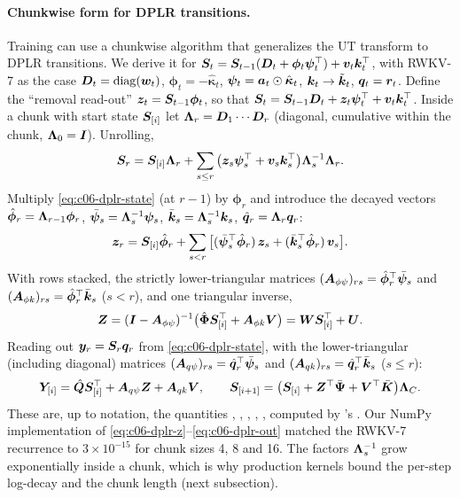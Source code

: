 \paragraph{Chunkwise form for DPLR transitions.}
Training can use a chunkwise algorithm that generalizes the UT transform to DPLR transitions.
We derive it for $\bm{S}_t=\bm{S}_{t-1}(\bm{D}_t+\bm\phi_t\bm\psi_t^{\top})+\bm{v}_t\bm{k}_t^{\top}$, with RWKV-7 as
the case $\bm{D}_t=\operatorname{diag}(\bm{w}_t)$, $\bm\phi_t=-\hat{\bm\kappa}_t$,
$\bm\psi_t=\bm{a}_t\odot\hat{\bm\kappa}_t$, $\bm{k}_t\to\tilde{\bm{k}}_t$, $\bm{q}_t=\bm{r}_t$. Define the
``removal read-out'' $\bm{z}_t=\bm{S}_{t-1}\bm\phi_t$, so that
$\bm{S}_t=\bm{S}_{t-1}\bm{D}_t+\bm{z}_t\bm\psi_t^{\top}+\bm{v}_t\bm{k}_t^{\top}$. Inside a chunk with start state
$\bm{S}_{[i]}$ let $\bm{\Lambda}_r=\bm{D}_1\cdots\bm{D}_r$ (diagonal, cumulative within the chunk,
$\bm{\Lambda}_0=\bm{I}$). Unrolling,
\begin{equation}\label{eq:c06-dplr-state}
  \bm{S}_r=\bm{S}_{[i]}\bm{\Lambda}_r+\sum_{s\le r}\big(\bm{z}_s\bm\psi_s^{\top}+\bm{v}_s\bm{k}_s^{\top}\big)\bm{\Lambda}_s^{-1}\bm{\Lambda}_r .
\end{equation}
Multiply \eqref{eq:c06-dplr-state} (at $r-1$) by $\bm\phi_r$ and introduce the decayed vectors
$\hat{\bm\phi}_r=\bm{\Lambda}_{r-1}\bm\phi_r$, $\bar{\bm\psi}_s=\bm{\Lambda}_s^{-1}\bm\psi_s$,
$\bar{\bm{k}}_s=\bm{\Lambda}_s^{-1}\bm{k}_s$, $\hat{\bm{q}}_r=\bm{\Lambda}_r\bm{q}_r$:
\begin{equation}
  \bm{z}_r=\bm{S}_{[i]}\hat{\bm\phi}_r+\sum_{s<r}\big[(\bar{\bm\psi}_s^{\top}\hat{\bm\phi}_r)\,\bm{z}_s+(\bar{\bm{k}}_s^{\top}\hat{\bm\phi}_r)\,\bm{v}_s\big].
\end{equation}
With rows stacked, the strictly lower-triangular matrices
$(\bm{A}_{\phi\psi})_{rs}=\hat{\bm\phi}_r^{\top}\bar{\bm\psi}_s$ and
$(\bm{A}_{\phi k})_{rs}=\hat{\bm\phi}_r^{\top}\bar{\bm{k}}_s$ ($s<r$), and one triangular inverse,
\begin{equation}\label{eq:c06-dplr-z}
  \bm{Z}=(\bm{I}-\bm{A}_{\phi\psi})^{-1}\big(\hat{\bm\Phi}\bm{S}_{[i]}^{\top}+\bm{A}_{\phi k}\bm{V}\big)
     =\bm{W}\bm{S}_{[i]}^{\top}+\bm{U} .
\end{equation}
Reading out $\bm{y}_r=\bm{S}_r\bm{q}_r$ from \eqref{eq:c06-dplr-state}, with the lower-triangular
(including diagonal) matrices $(\bm{A}_{q\psi})_{rs}=\hat{\bm{q}}_r^{\top}\bar{\bm\psi}_s$ and
$(\bm{A}_{qk})_{rs}=\hat{\bm{q}}_r^{\top}\bar{\bm{k}}_s$ ($s\le r$):
\begin{equation}\label{eq:c06-dplr-out}
  \bm{Y}_{[i]}=\hat{\bm{Q}}\bm{S}_{[i]}^{\top}+\bm{A}_{q\psi}\bm{Z}+\bm{A}_{qk}\bm{V},\qquad
  \bm{S}_{[i+1]}=\big(\bm{S}_{[i]}+\bm{Z}^{\top}\bar{\bm\Psi}+\bm{V}^{\top}\bar{\bm{K}}\big)\bm{\Lambda}_C .
\end{equation}
These are, up to notation, the quantities , , , ,
,  computed by \fla{}'s . Our NumPy implementation of
\eqref{eq:c06-dplr-z}--\eqref{eq:c06-dplr-out} matched the RWKV-7 recurrence to
$3\times10^{-15}$ for chunk sizes 4, 8 and 16. The factors $\bm{\Lambda}_s^{-1}$ grow
exponentially inside a chunk, which is why production kernels bound the per-step log-decay
and the chunk length (next subsection).


